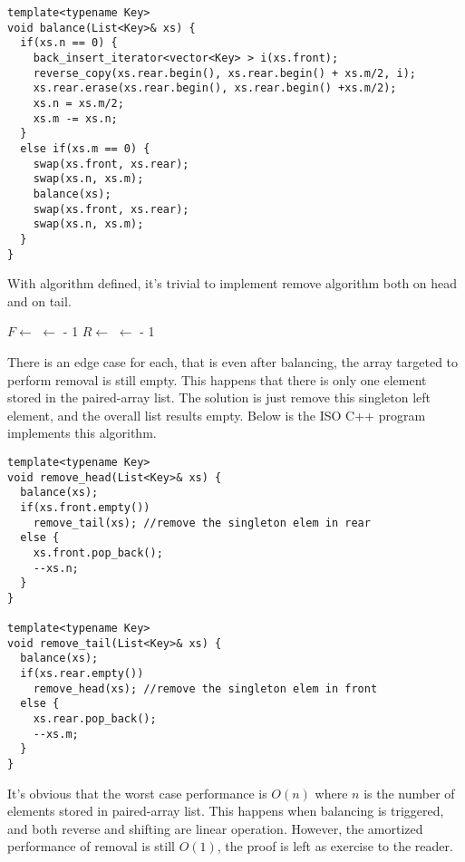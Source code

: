 \documentclass[UTF8]{article}
\begin{document}
\begin{lstlisting}
template<typename Key>
void balance(List<Key>& xs) {
  if(xs.n == 0) {
    back_insert_iterator<vector<Key> > i(xs.front);
    reverse_copy(xs.rear.begin(), xs.rear.begin() + xs.m/2, i);
    xs.rear.erase(xs.rear.begin(), xs.rear.begin() +xs.m/2);
    xs.n = xs.m/2;
    xs.m -= xs.n;
  }
  else if(xs.m == 0) {
    swap(xs.front, xs.rear);
    swap(xs.n, xs.m);
    balance(xs);
    swap(xs.front, xs.rear);
    swap(xs.n, xs.m);
  }
}
\end{lstlisting}

With  algorithm defined, it's trivial to implement remove algorithm
both on head and on tail.

\begin{algorithmic}
  \State {}
  \State $F \gets $ 
    \State {}
  \Else
    \State {} $\gets $  - 1
  \EndIf
\EndFunction
\Statex
{}
  \State {}
  \State $R \gets $ 
    \State {}
  \Else
    \State {} $\gets $  - 1
  \EndIf
\EndFunction
\end{algorithmic}

There is an edge case for each, that is even after balancing, the array targeted to
perform removal is still empty. This happens that there is only one element stored
in the paired-array list. The solution is just remove this singleton left element,
and the overall list results empty. Below is the ISO C++ program implements this
algorithm.

\begin{lstlisting}
template<typename Key>
void remove_head(List<Key>& xs) {
  balance(xs);
  if(xs.front.empty())
    remove_tail(xs); //remove the singleton elem in rear
  else {
    xs.front.pop_back();
    --xs.n;
  }
}

template<typename Key>
void remove_tail(List<Key>& xs) {
  balance(xs);
  if(xs.rear.empty())
    remove_head(xs); //remove the singleton elem in front
  else {
    xs.rear.pop_back();
    --xs.m;
  }
}
\end{lstlisting}

It's obvious that the worst case performance is $O(n)$ where $n$ is the number of elements
stored in paired-array list. This happens when balancing is triggered, and both reverse
and shifting are linear operation. However, the amortized performance of removal is still
$O(1)$, the proof is left as exercise to the reader.
\end{document}
